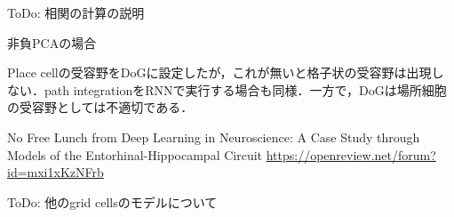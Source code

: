 ToDo: 相関の計算の説明




非負PCAの場合







Place cellの受容野をDoGに設定したが，これが無いと格子状の受容野は出現しない．path integrationをRNNで実行する場合も同様．一方で，DoGは場所細胞の受容野としては不適切である．

No Free Lunch from Deep Learning in Neuroscience: A Case Study through Models of the Entorhinal-Hippocampal Circuit 
\url{https://openreview.net/forum?id=mxi1xKzNFrb}

ToDo: 他のgrid cellsのモデルについて
